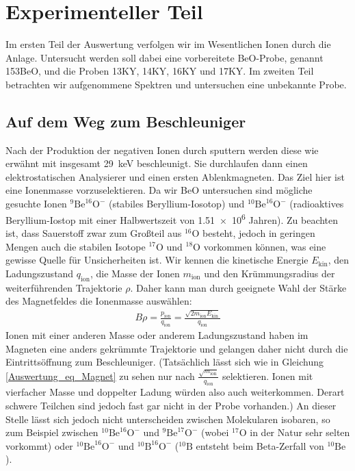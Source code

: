 \section{Experimenteller Teil}
Im ersten Teil der Auswertung verfolgen wir im Wesentlichen Ionen durch die Anlage.
Untersucht werden soll dabei eine vorbereitete BeO-Probe, genannt \glqq 153BeO\grqq{}, und die Proben \glqq 13KY\grqq{}, \glqq 14KY\grqq{}, \glqq 16KY\grqq{} und \glqq 17KY\grqq{}.
Im zweiten Teil betrachten wir aufgenommene Spektren und untersuchen eine unbekannte Probe.

\subsection{Auf dem Weg zum Beschleuniger}
Nach der Produktion der negativen Ionen durch sputtern werden diese wie erwähnt mit insgesamt \SI{29}{\kilo\electronvolt} beschleunigt.
Sie durchlaufen dann einen elektrostatischen Analysierer und einen ersten Ablenkmagneten.
Das Ziel hier ist eine Ionenmasse vorzuselektieren.
Da wir BeO untersuchen sind mögliche gesuchte Ionen $^{9}\text{Be}^{16}\text{O}^{-}$ (stabiles Beryllium-Iosotop) und $^{10}\text{Be}^{16}\text{O}^{-}$ (radioaktives Beryllium-Iostop mit einer Halbwertszeit von \num{1.51e6} Jahren).
Zu beachten ist, dass Sauerstoff zwar zum Großteil aus $^{16}$O besteht, jedoch in geringen Mengen auch die stabilen Isotope $^{17}$O und $^{18}$O vorkommen können, was eine gewisse Quelle für Unsicherheiten ist.
Wir kennen die kinetische Energie $E_{\text{kin}}$, den Ladungszustand $q_{\text{ion}}$, die Masse der Ionen $m_{\text{ion}}$ und den Krümmungsradius der weiterführenden Trajektorie $\rho$.
Daher kann man durch geeignete Wahl der Stärke des Magnetfeldes die Ionenmasse auswählen:
\begin{gather}
    B \rho = \frac{p_{\text{ion}}}{q_{\text{ion}}} = \frac{\sqrt{2m_{\text{ion}}E_{\text{kin}}}}{q_{\text{ion}}}
    \label{Auswertung_eq_Magnet}
\end{gather}
Ionen mit einer anderen Masse oder anderem Ladungszustand haben im Magneten eine anders gekrümmte Trajektorie und gelangen daher nicht durch die Eintrittsöffnung zum Beschleuniger.
(Tatsächlich lässt sich wie in Gleichung \ref{Auswertung_eq_Magnet} zu sehen nur nach $\frac{\sqrt{m_{\text{ion}}}}{q_{\text{ion}}}$ selektieren.
Ionen mit vierfacher Masse und doppelter Ladung würden also auch weiterkommen. Derart schwere Teilchen sind jedoch fast gar nicht in der Probe vorhanden.)
An dieser Stelle lässt sich jedoch nicht unterscheiden zwischen Molekularen isobaren, so zum Beispiel zwischen $^{10}\text{Be}^{16}\text{O}^{-}$ und $^{9}\text{Be}^{17}\text{O}^{-}$ (wobei $^{17}\text{O}$ in der Natur sehr selten vorkommt) oder $^{10}\text{Be}^{16}\text{O}^{-}$ und $^{10}\text{B}^{16}\text{O}^{-}$ ($^{10}\text{B}$ entsteht beim Beta-Zerfall von $^{10}\text{Be}$).
